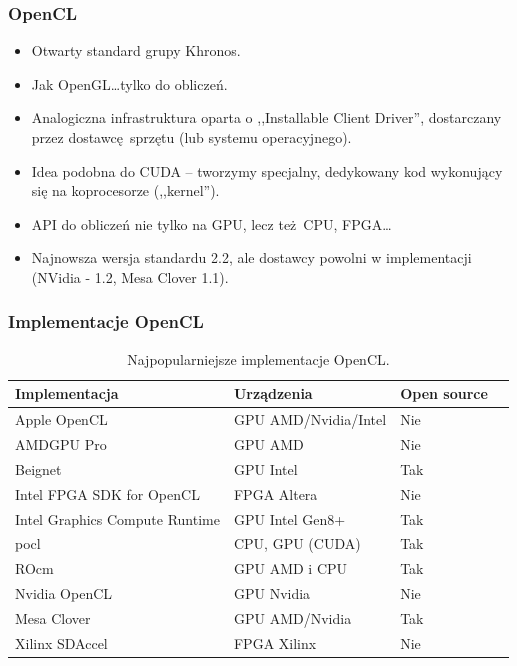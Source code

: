 \documentclass[dvipsnames,table]{beamer}
\begin{document}
\begin{frame}
	\frametitle{OpenCL}
\begin{itemize}
	\item Otwarty standard grupy Khronos.
	\item Jak OpenGL\ldots tylko do obliczeń.
	\item Analogiczna infrastruktura oparta o ,,Installable Client Driver'', dostarczany przez dostawcę sprzętu (lub systemu operacyjnego).
	\item Idea podobna do CUDA -- tworzymy specjalny, dedykowany kod wykonujący się na koprocesorze (,,kernel'').
	\item API do obliczeń nie tylko na GPU, lecz też CPU, FPGA\ldots
	\item Najnowsza wersja standardu 2.2, ale dostawcy powolni w implementacji (NVidia - 1.2, Mesa Clover 1.1).
\end{itemize}
\end{frame}


\begin{frame}[fragile]
	\frametitle{Implementacje OpenCL}
\begin{table}[]
\centering
\caption{Najpopularniejsze implementacje OpenCL.}
\label{porownanie}
\scriptsize
\begin{tabular}{llll}
\hline
Implementacja &  Urządzenia  & Open source   \\ \hline
Apple OpenCL & GPU AMD/Nvidia/Intel & Nie \\
AMDGPU Pro & GPU AMD & Nie \\
Beignet & GPU Intel & Tak \\
Intel FPGA SDK for OpenCL & FPGA Altera & Nie \\
Intel Graphics Compute Runtime & GPU Intel Gen8+ & Tak \\
pocl & CPU, GPU (CUDA) & Tak \\
ROcm & GPU AMD i CPU & Tak \\
Nvidia OpenCL & GPU Nvidia & Nie \\
Mesa Clover & GPU AMD/Nvidia & Tak \\
Xilinx SDAccel & FPGA Xilinx & Nie \\ \hline
\end{tabular}
\normalsize
\end{table}
\end{frame}
\end{document}
